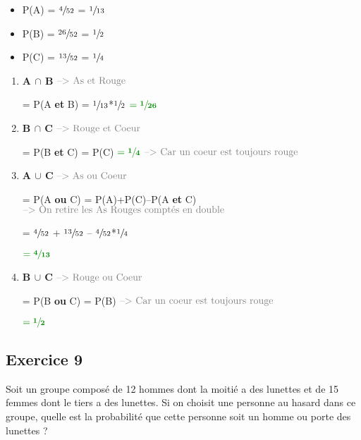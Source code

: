 \documentclass[french]{article}
\begin{document}
\begin{itemize}
\item P(A) = \(\sfrac{4}{52}\) = \(\sfrac{1}{13}\)
\item P(B) = \(\sfrac{26}{52}\) = \(\sfrac{1}{2}\)
\item P(C) = \(\sfrac{13}{52}\) = \(\sfrac{1}{4}\)
\end{itemize}

\begin{enumerate}
\item \textbf{A \(\cap\) B} \emph{\(\textcolor{gray}{\text{--> As et Rouge}}\)}
\label{sec:orga84da8f}

= P(A \textbf{et} B) = \(\sfrac{1}{13}\)*\(\sfrac{1}{2}\)
\(\textcolor{luckydarkgreen}{\mathbf{= \sfrac{1}{26}}}\)

\item \textbf{B \(\cap\) C} \emph{\(\textcolor{gray}{\text{--> Rouge et Coeur}}\)}
\label{sec:org054730d}

= P(B \textbf{et} C) = P(C) \(\textcolor{luckydarkgreen}{\mathbf{= \sfrac{1}{4}}}\) \emph{\(\textcolor{gray}{\text{--> Car un coeur est toujours rouge}}\)}

\item \textbf{A \(\cup\) C} \emph{\(\textcolor{gray}{\text{--> As ou Coeur}}\)}
\label{sec:org4113b04}

= P(A \textbf{ou} C) = P(A)+P(C)--P(A \textbf{et} C) \emph{\(\textcolor{gray}{\text{--> On retire les As Rouges comptés en double}}\)}

= \(\sfrac{4}{52}\) + \(\sfrac{13}{52}\) -- \(\sfrac{4}{52}\)*\(\sfrac{1}{4}\)

\(\textcolor{luckydarkgreen}{\mathbf{= \sfrac{4}{13}}}\)

\item \textbf{B \(\cup\) C} \(\textcolor{gray}{\text{--> Rouge ou Coeur}}\)
\label{sec:org763e717}

= P(B \textbf{ou} C) = P(B) \emph{\(\textcolor{gray}{\text{--> Car un coeur est toujours rouge}}\)}

\(\textcolor{luckydarkgreen}{\mathbf{= \sfrac{1}{2}}}\)
\end{enumerate}

\subsection{Exercice 9}
\label{sec:org8efd4f7}

Soit un groupe composé de 12 hommes dont la moitié a des lunettes et de 15 femmes dont le tiers a des lunettes. Si on choisit une personne au hasard dans ce groupe, quelle est la probabilité que cette personne soit un homme ou porte des lunettes ?
\end{document}
